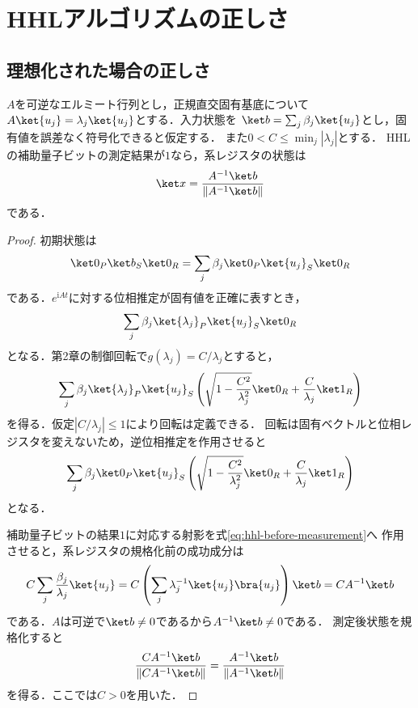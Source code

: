 \section{HHLアルゴリズムの正しさ}
\label{sec:hhl-correctness}

\subsection{理想化された場合の正しさ}

\begin{theo}[理想HHLの正しさ]
$A$を可逆なエルミート行列とし，正規直交固有基底について
$A\ket{u_j}=\lambda_j\ket{u_j}$とする．入力状態を
$\ket b=\sum_j\beta_j\ket{u_j}$とし，固有値を誤差なく符号化できると仮定する．
また$0<C\leq\min_j|\lambda_j|$とする．
HHLの補助量子ビットの測定結果が$1$なら，系レジスタの状態は
\begin{equation}
 \ket x=\frac{A^{-1}\ket b}{\lVert A^{-1}\ket b\rVert}
 \label{eq:hhl-correct-output}
\end{equation}
である．
\end{theo}

\begin{proof}
初期状態は
\[
 \ket0_P\ket b_S\ket0_R
 =\sum_j\beta_j\ket0_P\ket{u_j}_S\ket0_R
\]
である．$e^{\mathrm{i}At}$に対する位相推定が固有値を正確に表すとき，
\[
 \sum_j\beta_j\ket{\lambda_j}_P\ket{u_j}_S\ket0_R
\]
となる．第2章の制御回転で$g(\lambda_j)=C/\lambda_j$とすると，
\[
 \sum_j\beta_j\ket{\lambda_j}_P\ket{u_j}_S
 \left(
  \sqrt{1-\frac{C^2}{\lambda_j^2}}\ket0_R
  +\frac{C}{\lambda_j}\ket1_R
 \right)
\]
を得る．仮定$|C/\lambda_j|\leq1$により回転は定義できる．
回転は固有ベクトルと位相レジスタを変えないため，逆位相推定を作用させると
\begin{equation}
 \sum_j\beta_j\ket0_P\ket{u_j}_S
 \left(
  \sqrt{1-\frac{C^2}{\lambda_j^2}}\ket0_R
  +\frac{C}{\lambda_j}\ket1_R
 \right)
 \label{eq:hhl-before-measurement}
\end{equation}
となる．

補助量子ビットの結果$1$に対応する射影を式\eqref{eq:hhl-before-measurement}へ
作用させると，系レジスタの規格化前の成功成分は
\[
 C\sum_j\frac{\beta_j}{\lambda_j}\ket{u_j}
 =C\left(\sum_j\lambda_j^{-1}\ket{u_j}\bra{u_j}\right)\ket b
 =CA^{-1}\ket b
\]
である．$A$は可逆で$\ket b\ne0$であるから$A^{-1}\ket b\ne0$である．
測定後状態を規格化すると
\[
 \frac{CA^{-1}\ket b}{\lVert CA^{-1}\ket b\rVert}
 =\frac{A^{-1}\ket b}{\lVert A^{-1}\ket b\rVert}
\]
を得る．ここでは$C>0$を用いた．
\end{proof}

